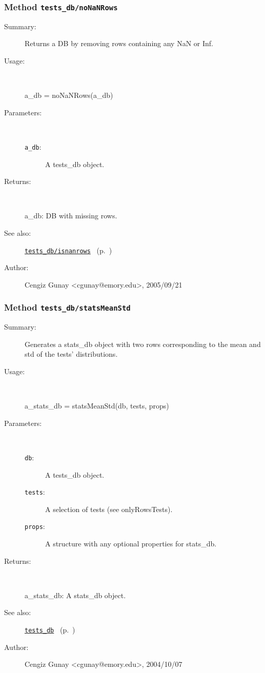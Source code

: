 \subsubsection[Method \texttt{noNaNRows}]{Method \texttt{tests\_db/noNaNRows}}%
%
\label{ref_tests_db__noNaNRows}%
\hypertarget{ref_tests_db__noNaNRows}{}%
\begin{description}
\item[Summary:]Returns a DB by removing rows containing any NaN or Inf.
%
\item[Usage:]~%
\begin{lyxcode}%
a\_db = noNaNRows(a\_db)
%
\end{lyxcode}%
%
%
\item[Parameters:]~
\begin{description}%
\item[\texttt{a\_db}:]
 A tests\_db object.
\end{description}%
%
\item[Returns:]~

	a\_db: DB with missing rows.
%
%
\item[See also:]%
\hyperlink{ref_tests_db__isnanrows}{\texttt{tests\_db/isnanrows}}%
\ (p.~\pageref{ref_tests_db__isnanrows})%
%
%
\item[Author:]%
Cengiz Gunay <cgunay@emory.edu>, 2005/09/21%
\end{description}
\methodline%
\subsubsection[Method \texttt{statsMeanStd}]{Method \texttt{tests\_db/statsMeanStd}}%
%
\label{ref_tests_db__statsMeanStd}%
\hypertarget{ref_tests_db__statsMeanStd}{}%
\begin{description}
\item[Summary:]Generates a stats\_db object with two rows corresponding to 
		the mean and std of the tests' distributions.
%
\item[Usage:]~%
\begin{lyxcode}%
a\_stats\_db = statsMeanStd(db, tests, props)
%
\end{lyxcode}%
%
%
\item[Parameters:]~
\begin{description}%
\item[\texttt{db}:]
 A tests\_db object.
\item[\texttt{tests}:]
 A selection of tests (see onlyRowsTests).
\item[\texttt{props}:]
 A structure with any optional properties for stats\_db.
\end{description}%
%
\item[Returns:]~

	a\_stats\_db: A stats\_db object.
%
%
\item[See also:]%
\hyperlink{ref_tests_db}{\texttt{tests\_db}}%
\ (p.~\pageref{ref_tests_db})%
%
%
\item[Author:]%
Cengiz Gunay <cgunay@emory.edu>, 2004/10/07%
\end{description}
\methodline%

